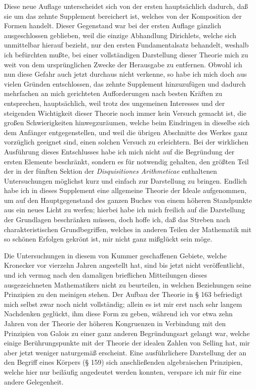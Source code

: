 \documentclass[11pt]{article}
\newcommand{\origpage}[1]{\par\vspace{0.25em}\noindent{\footnotesize\itshape [Gedruckte Seite #1]}\par\vspace{0.25em}}
\begin{document}
Diese neue Auflage unterscheidet sich von der ersten hauptsächlich dadurch, daß sie um das zehnte Supplement bereichert ist, welches von der Komposition der Formen handelt. Dieser Gegenstand war bei der ersten Auflage gänzlich ausgeschlossen geblieben, weil die einzige Abhandlung Dirichlets, welche sich unmittelbar hierauf bezieht, nur den ersten Fundamentalsatz behandelt, weshalb ich befürchten mußte, bei einer vollständigen Darstellung dieser Theorie mich zu weit von dem ursprünglichen Zwecke der Herausgabe zu entfernen. Obwohl ich nun diese Gefahr auch jetzt durchaus nicht verkenne, so habe ich mich doch aus vielen Gründen entschlossen, das zehnte Supplement hinzuzufügen und dadurch mehrfachen an mich gerichteten Aufforderungen nach besten Kräften zu entsprechen, hauptsächlich, weil trotz des ungemeinen Interesses und der steigenden Wichtigkeit dieser Theorie noch immer kein Versuch gemacht ist, die großen Schwierigkeiten hinwegzuräumen, welche beim Eindringen in dieselbe sich dem Anfänger entgegenstellen, und weil die übrigen Abschnitte des Werkes ganz vorzüglich geeignet sind, einen solchen Versuch zu erleichtern. Bei der wirklichen Ausführung dieses Entschlusses habe ich mich nicht auf die Begründung der ersten Elemente beschränkt, sondern es für notwendig gehalten, den größten Teil der in der fünften Sektion der \textit{Disquisitiones Arithmeticae} enthaltenen Untersuchungen möglichst kurz und einfach zur Darstellung zu bringen. Endlich habe ich in dieses Supplement eine allgemeine Theorie der Ideale aufgenommen, um auf den Hauptgegenstand des ganzen Buches von einem höheren Standpunkte aus ein neues Licht zu werfen; hierbei habe ich mich freilich auf die Darstellung der Grundlagen beschränken müssen, doch hoffe ich, daß das Streben nach charakteristischen Grundbegriffen, welches in anderen Teilen der Mathematik mit so schönen Erfolgen gekrönt ist, mir nicht ganz mißglückt sein möge.

\origpage{397}
Die Untersuchungen in diesem von Kummer geschaffenen Gebiete, welche Kronecker vor vierzehn Jahren angestellt hat, sind bis jetzt nicht veröffentlicht, und ich vermag nach den damaligen brieflichen Mitteilungen dieses ausgezeichneten Mathematikers nicht zu beurteilen, in welchen Beziehungen seine Prinzipien zu den meinigen stehen. Der Aufbau der Theorie in § 163 befriedigt mich selbst zwar noch nicht vollständig; allein es ist mir erst nach sehr langem Nachdenken geglückt, ihm diese Form zu geben, während ich vor etwa zehn Jahren von der Theorie der höheren Kongruenzen in Verbindung mit den Prinzipien von Galois zu einer ganz anderen Begründungsart gelangt war, welche einige Berührungspunkte mit der Theorie der idealen Zahlen von Selling hat, mir aber jetzt weniger naturgemäß erscheint. Eine ausführlichere Darstellung der an den Begriff eines Körpers (§ 159) sich anschließenden algebraischen Prinzipien, welche hier nur beiläufig angedeutet werden konnten, verspare ich mir für eine andere Gelegenheit.
\end{document}
